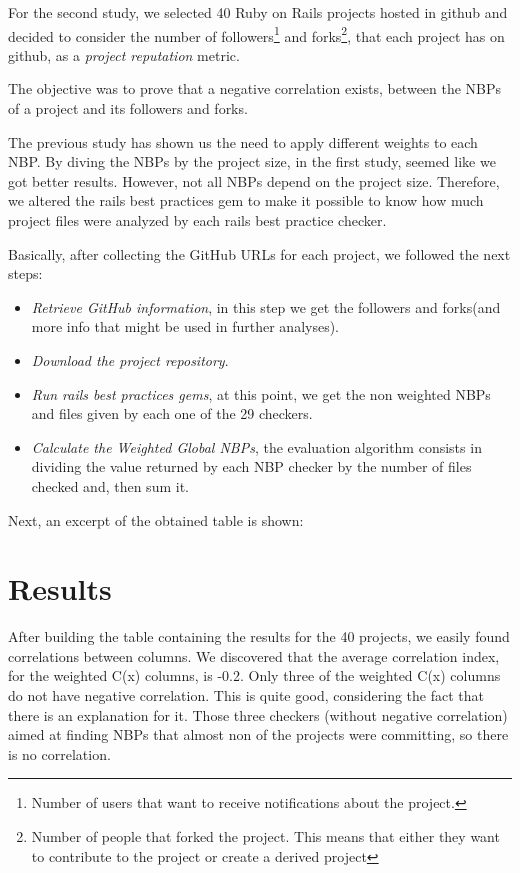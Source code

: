 For the second study, we selected 40 Ruby on Rails projects hosted in github and
decided to consider the number of 
\textsf{followers}\footnote{Number of users that want to receive notifications about the project.} and
\textsf{forks}\footnote{Number of people that forked the project. This means that either they want to contribute to the project or create a derived project}, 
that each project has on github, 
as a \emph{project reputation} metric. 

The objective was to prove that a negative correlation exists, between the NBPs of a project and its followers and forks. 

The previous study has shown us the need to apply different weights to each NBP. 
By diving the NBPs by the project size, in the first study, seemed like we got better results.
However, not all NBPs depend on the project size. 
Therefore, we altered the rails best practices gem to make it possible to know how much project files were analyzed 
by each rails best practice checker.

Basically, after collecting the GitHub URLs for each project, we followed the next steps:
\begin{itemize}
\item \emph{Retrieve GitHub information}, in this step we get the followers and forks(and more info that might be used in further analyses).
\item \emph{Download the project repository}.
\item \emph{Run rails best practices gems}, at this point, we get the non weighted NBPs and files given by each one of the 29 checkers.
\item \emph{Calculate the Weighted Global NBPs}, the evaluation algorithm consists in dividing the value returned by each NBP checker  by the number of files checked and, then sum it.
\end{itemize}

Next, an excerpt of the obtained table is shown:


\section{Results}\label{subsec:results}
After building the table containing the results for the 40 projects, we easily found correlations between columns.
We discovered that the average correlation index, for the weighted C(x) columns, is -0.2. Only three of the weighted C(x) columns do not have negative correlation. This is quite good, considering the fact that there is an explanation for it. 
Those three checkers (without negative correlation) aimed at finding  NBPs that almost non of the projects were committing, 
so there is no correlation.


